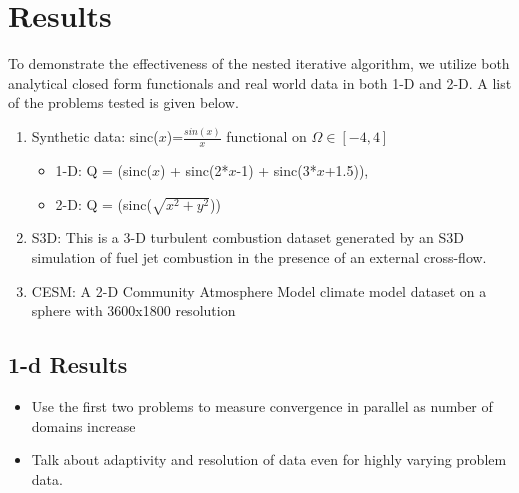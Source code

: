 
\section{Results}
\label{sec:results}

To demonstrate the effectiveness of the nested iterative algorithm, we utilize both analytical closed form functionals and real world data in both 1-D and 2-D. A list of the problems tested is given below.


\begin{enumerate}
	\item Synthetic data: sinc($x$)=$\frac{sin(x)}{x}$ functional on $\Omega \in [-4, 4]$
	\begin{itemize}
		\item 1-D: Q = (sinc($x$) + sinc(2*$x$-1) + sinc(3*$x$+1.5)), 
		\item 2-D: Q = (sinc($\sqrt{x^2+y^2}$))
	\end{itemize}
	\item S3D: This is a 3-D turbulent combustion dataset generated by an S3D simulation \cite{chen-s3d-2009} of fuel jet combustion in the presence of an external cross-flow. 
	\item CESM: A 2-D Community Atmosphere Model climate model dataset on a sphere with 3600x1800 resolution
\end{enumerate}


\subsection{1-d Results}\label{AA}


\begin{itemize}
	\item Use the first two problems to measure convergence in parallel as number of domains increase
	\item Talk about adaptivity and resolution of data even for highly varying problem data.
\end{itemize}

